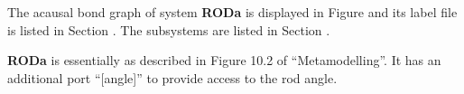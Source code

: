 
%

   The acausal bond graph of system \textbf{RODa} is
   displayed in Figure  and its label
   file is listed in Section .
   The subsystems are listed in Section .

{\bf RODa} is essentially as described in Figure 10.2 of
``Metamodelling''. It has an additional port ``[angle]'' to provide
access to the rod angle.

